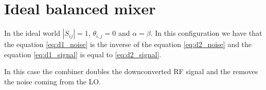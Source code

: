 \section{Ideal balanced mixer}

In the ideal world $|S_{ij}| = 1$, $\theta_{i,j}=0$ and $\alpha = \beta$. In this configuration we have that the equation \ref{eq:d1_noise} is the inverse of the equation \ref{eq:d2_noise} and the equation \ref{eq:d1_signal} is equal to \ref{eq:d2_signal}.

In this case the combiner doubles the downconverted RF signal and the removes the noise coming from the LO.

